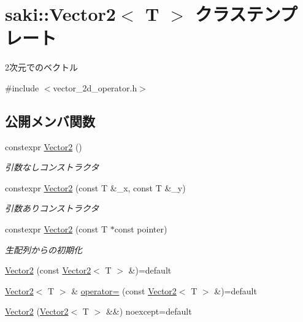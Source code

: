 \hypertarget{classsaki_1_1_vector2}{}\section{saki\+:\+:Vector2$<$ T $>$ クラステンプレート}
\label{classsaki_1_1_vector2}


2次元でのベクトル  




{\ttfamily \#include $<$vector\+\_\+2d\+\_\+operator.\+h$>$}

\subsection*{公開メンバ関数}
\begin{DoxyCompactItemize}
\item 
constexpr \mbox{\hyperlink{classsaki_1_1_vector2_af57b72f4255812a361bef1922a226f86}{Vector2}} ()
\begin{DoxyCompactList}\small\item\em 引数なしコンストラクタ \end{DoxyCompactList}\item 
constexpr \mbox{\hyperlink{classsaki_1_1_vector2_ad0f3d0a05370f1ef4947520245f6e9a8}{Vector2}} (const T \&\+\_\+x, const T \&\+\_\+y)
\begin{DoxyCompactList}\small\item\em 引数ありコンストラクタ \end{DoxyCompactList}\item 
constexpr \mbox{\hyperlink{classsaki_1_1_vector2_ad2c0fd66544f68066179490647244b14}{Vector2}} (const T $\ast$const pointer)
\begin{DoxyCompactList}\small\item\em 生配列からの初期化 \end{DoxyCompactList}\item 
\mbox{\hyperlink{classsaki_1_1_vector2_af3d61bb90047a8621cba0a17b265bfaa}{Vector2}} (const \mbox{\hyperlink{classsaki_1_1_vector2}{Vector2}}$<$ T $>$ \&)=default
\item 
\mbox{\hyperlink{classsaki_1_1_vector2}{Vector2}}$<$ T $>$ \& \mbox{\hyperlink{classsaki_1_1_vector2_ae6ee2a6387bfe58bdd5bf74d388370a9}{operator=}} (const \mbox{\hyperlink{classsaki_1_1_vector2}{Vector2}}$<$ T $>$ \&)=default
\item 
\mbox{\hyperlink{classsaki_1_1_vector2_ade059efe536b29346642aacbd973d062}{Vector2}} (\mbox{\hyperlink{classsaki_1_1_vector2}{Vector2}}$<$ T $>$ \&\&) noexcept=default

\end{DoxyCompactItemize}
